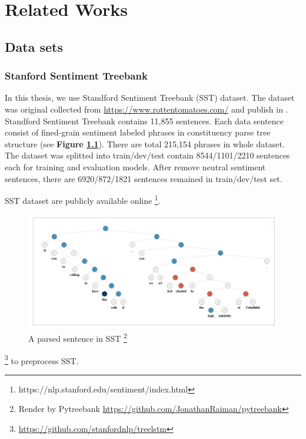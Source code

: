 \chapter{Related Works}

\section{Data sets}
\subsection{Stanford Sentiment Treebank} \label{sec:sst}
In this thesis, we use Standford Sentiment Treebank (SST) dataset\cite{socher2013recursive}. The dataset was original collected from \url{https://www.rottentomatoes.com/} and publish in \cite{pang2002thumbs}. Standford Sentiment Treebank contains 11,855 sentences. Each data sentence consist of fined-grain sentiment labeled phrases in constituency parse tree structure (see \textbf{Figure \ref{fig:sst}}). There are total 215,154 phrases in whole dataset. 
The dataset was splitted into train/dev/test contain 8544/1101/2210 sentences each for training and evaluation models. After remove neutral sentiment sentences, there are 6920/872/1821 sentences remained in train/dev/test set.

SST dataset are publicly available online \footnote{https://nlp.stanford.edu/sentiment/index.html}.

\begin{figure}[H]
	\begin{minipage}{\textwidth}
		\centering
		\includegraphics[width=0.9\linewidth]{figure/sst}
		\caption[A parsed sentence in SST]{A parsed sentence in SST \footnote{Render by Pytreebank \url{https://github.com/JonathanRaiman/pytreebank}}}
		\label{fig:sst}
	\end{minipage}
\end{figure}

\footnote{\url{https://github.com/stanfordnlp/treelstm}} to preprocess SST.

